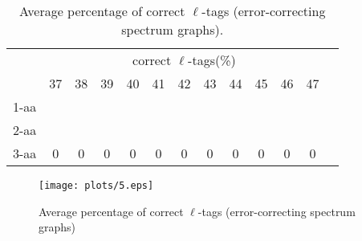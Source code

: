 \documentclass{article}
\begin{document}
\begin{landscape}
\begin{table}[h]
\vspace{3mm}
\end{table}
\begin{table}[h]\tiny
\vspace{3mm}
{\centering
\begin{center}
\begin{tabular}{|l|c|c|c|c|c|c|c|c|c|c|c|c|}
  \hline
  & \multicolumn{ 11 }{|c|}{correct $\ell$-tags(\%)} \\
  \cline{2- 12}
    & 37 & 38 & 39 & 40 & 41 & 42 & 43 & 44 & 45 & 46 & 47\\
  \hline
1-aa  &  &  &  &  &  &  &  &  &  &  & \\
2-aa  &  &  &  &  &  &  &  &  &  &  & \\
3-aa  & 0 & 0 & 0 & 0 & 0 & 0 & 0 & 0 & 0 & 0 & 0\\
 \hline
\end{tabular}
\end{center}
\par}
\centering

\caption{ Average percentage of correct $\ell$-tags (error-correcting spectrum graphs).}
\label{table:table5}

\vspace{3mm}
\end{table}
\end{landscape}

\begin{figure}
  \begin{center}
\texttt{[image: plots/5.eps]}

\end{center}
\caption{Average percentage of correct $\ell$-tags (error-correcting spectrum graphs)}
  \label{fig:LABEL}
\end{figure}
\end{document}
